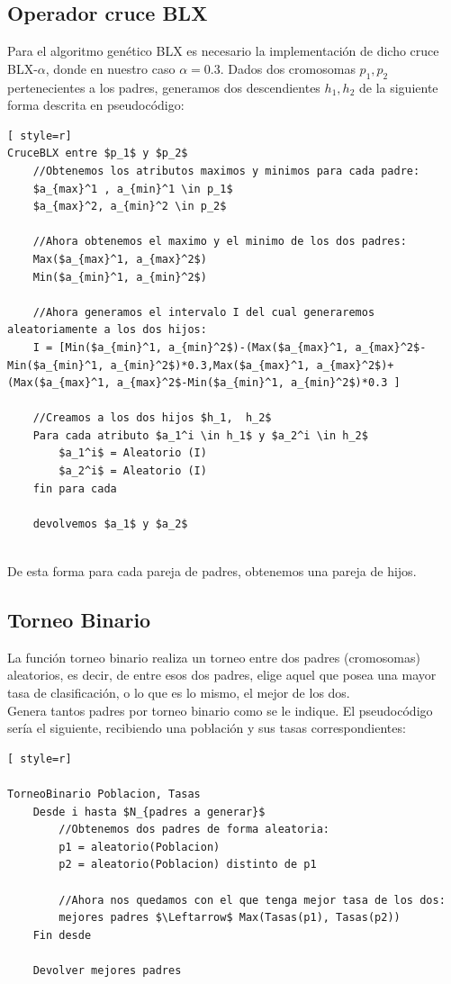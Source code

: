 \subsection{Operador cruce BLX}
Para el algoritmo genético BLX es necesario la implementación de dicho cruce BLX-$\alpha$, donde en nuestro caso $\alpha = 0.3$.
Dados dos cromosomas $p_1,  p_2$ pertenecientes a los padres, generamos dos descendientes $h_1, h_2$
de la siguiente forma descrita en pseudocódigo:

\begin{lstlisting}[ style=r]
CruceBLX entre $p_1$ y $p_2$
	//Obtenemos los atributos maximos y minimos para cada padre:
	$a_{max}^1 , a_{min}^1 \in p_1$
	$a_{max}^2, a_{min}^2 \in p_2$
	
	//Ahora obtenemos el maximo y el minimo de los dos padres:
	Max($a_{max}^1, a_{max}^2$)
	Min($a_{min}^1, a_{min}^2$)
	
	//Ahora generamos el intervalo I del cual generaremos aleatoriamente a los dos hijos:
	I = [Min($a_{min}^1, a_{min}^2$)-(Max($a_{max}^1, a_{max}^2$-Min($a_{min}^1, a_{min}^2$)*0.3,Max($a_{max}^1, a_{max}^2$)+(Max($a_{max}^1, a_{max}^2$-Min($a_{min}^1, a_{min}^2$)*0.3 ]
	
	//Creamos a los dos hijos $h_1,  h_2$
	Para cada atributo $a_1^i \in h_1$ y $a_2^i \in h_2$
		$a_1^i$ = Aleatorio (I)
		$a_2^i$ = Aleatorio (I)
	fin para cada
	
	devolvemos $a_1$ y $a_2$
		
\end{lstlisting}

De esta forma para cada pareja de padres, obtenemos una pareja de hijos.


\subsection{Torneo Binario}
La función torneo binario realiza un torneo entre dos padres (cromosomas) aleatorios, es decir, de entre esos dos padres, elige aquel que posea una mayor tasa de clasificación, o lo que es lo mismo, el mejor de los dos.\\ 
Genera tantos padres por torneo binario como se le indique. El pseudocódigo sería el siguiente, recibiendo una población y sus tasas correspondientes:

\begin{lstlisting}[ style=r]

TorneoBinario Poblacion, Tasas
	Desde i hasta $N_{padres a generar}$
		//Obtenemos dos padres de forma aleatoria:
		p1 = aleatorio(Poblacion)
		p2 = aleatorio(Poblacion) distinto de p1
		
		//Ahora nos quedamos con el que tenga mejor tasa de los dos:
		mejores padres $\Leftarrow$ Max(Tasas(p1), Tasas(p2))
	Fin desde
	
	Devolver mejores padres

\end{lstlisting}

